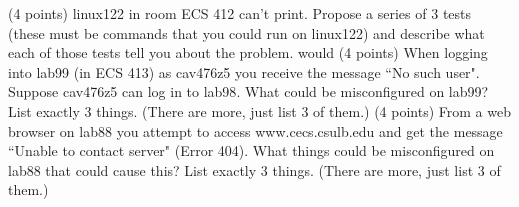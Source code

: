 \ques
(4 points)
{\ltt{}linux122} in room ECS 412 can't print.
Propose a series of 3 tests (these must be commands
that you could run on {\ltt{}linux122}) and
describe what each of those tests tell you
about the problem.
would 
\vskip 0.5in
\vfill
\ques
(4 points)
When logging into {\ltt{}lab99} (in ECS 413)
as {\ltt{}cav476z5} you receive the message
``No such user".
Suppose {\ltt{}cav476z5}  can log in to {\ltt{}lab98}.
What could be misconfigured on {\ltt{}lab99}?
List exactly 3 things. (There are more, just list 3 of them.)
\vfill
\ques
(4 points)
From a web browser on {\ltt{}lab88} you attempt to access {\ltt{}www.cecs.csulb.edu}
and get the message ``Unable to contact server" (Error 404).
What things could be misconfigured on {\ltt{}lab88} that could cause this?
List exactly 3 things. (There are more, just list 3 of them.)
\bye
